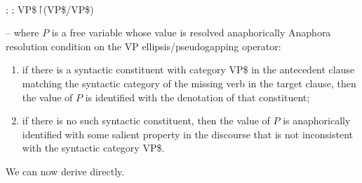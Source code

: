 \documentclass[output=paper,colorlinks,citecolor=brown]{langscibook}
\begin{document}
\begin{exe}
 \ex\label{generalized}
   \\
  ; ; VP\$\ensuremath{\vs}(VP\$/VP\$)

   -- where $P$ is a free variable whose value is
  resolved anaphorically
 \ex\label{Acondition}
  Anaphora resolution condition on the VP ellipsis/pseudogapping
  operator:
  \begin{enumerate}
   \item
    if there is a syntactic  constituent
    with category VP\$ in the antecedent clause matching the
    syntactic  category of the missing verb in the target clause,
    then the value of $P$ is identified with the denotation of that constituent;
   \item
    if there is no such syntactic  constituent, then the value of $P$  is anaphorically
    identified with some salient property in the discourse that is not
    inconsistent with the syntactic  category VP\$.
  \end{enumerate}
\end{exe}
We can now derive  directly.
\end{document}
